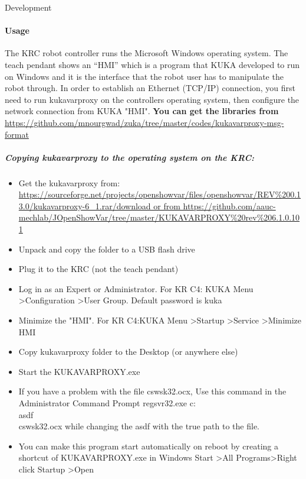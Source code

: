 \documentclass[a4paper]{book}
\begin{document}
\begin{chapter}{Development}
\paragraph{Usage}
The KRC robot controller runs the Microsoft Windows operating system. The teach pendant shows an “HMI” which is a program that KUKA developed to run on Windows and it is the interface that the robot user has to manipulate the robot through. In order to establish an Ethernet (TCP/IP) connection, you first need to run kukavarproxy on the controllers operating system, then configure the network connection from KUKA "HMI".
\newline \vspace{.3cm}
\textbf{You can get the libraries from}
\newline \url{https://github.com/mnourgwad/zuka/tree/master/codes/kukavarproxy-msg-format}
\subparagraph{Copying kukavarproxy to the operating system on the KRC:}
\begin{itemize}
	\item Get the kukavarproxy from: \newline  \url{https://sourceforge.net/projects/openshowvar/files/openshowvar/REV\%200.13.0/kukavarproxy-6_1.rar/download  or from https://github.com/aauc-mechlab/JOpenShowVar/tree/master/KUKAVARPROXY\%20rev\%206.1.0.101}
	\item Unpack and copy the folder to a USB flash drive
	\item Plug it to the KRC (not the teach pendant)
	\item Log in as an Expert or Administrator. For KR C4: KUKA Menu \textgreater Configuration \textgreater User Group. Default password is kuka
	\item Minimize the "HMI". For KR C4:KUKA Menu \textgreater Startup \textgreater Service \textgreater Minimize HMI
	\item Copy kukavarproxy folder to the Desktop (or anywhere else)
	\item Start the KUKAVARPROXY.exe
	\item If you have a problem with the file cswsk32.ocx, Use this command in the Administrator Command Prompt regsvr32.exe c:\\asdf\\cswsk32.ocx while changing the asdf with the true path to the file.
	\item You can make this program start automatically on reboot by creating a shortcut of KUKAVARPROXY.exe in Windows Start \textgreater All Programs\textgreater Right click Startup \textgreater Open
	

\end{itemize}
\end{chapter}
\end{document}
